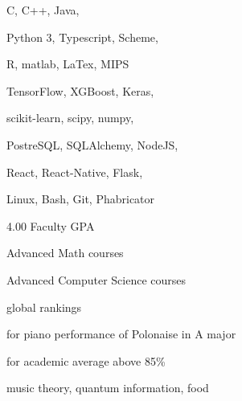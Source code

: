 C, C++, Java,
\smallskip

Python 3, Typescript, Scheme,
\smallskip

R, matlab, LaTex, MIPS

\divider\smallskip

TensorFlow, XGBoost, Keras,
\smallskip

scikit-learn, scipy, numpy,
\smallskip

PostreSQL, SQLAlchemy, NodeJS,
\smallskip

React, React-Native, Flask,

\divider\smallskip

Linux, Bash, Git, Phabricator



4.00 Faculty GPA

Advanced Math courses

Advanced Computer Science courses


global rankings

\divider\smallskip

for piano performance of Polonaise in A major

\divider\smallskip

for academic average above 85\%

music theory, quantum information, food
